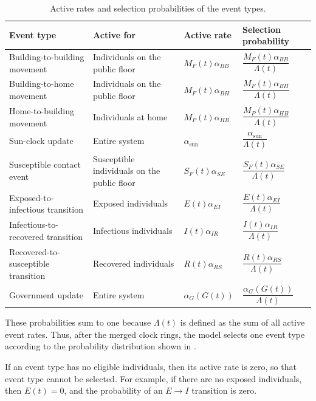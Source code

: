 \documentclass[11pt]{article}
\theoremstyle{definition}
\theoremstyle{plain}
\begin{document}
\begin{table}[H]
\centering
\caption{Active rates and selection probabilities of the event types.}
\label{tab:select}
\small
\renewcommand{\arraystretch}{1.8}
\begin{tabularx}{\textwidth}{@{}>{\raggedright\arraybackslash}X >{\raggedright\arraybackslash}X l l@{}}
\toprule
\textbf{Event type}
& \textbf{Active for}
& \textbf{Active rate}
& \textbf{Selection probability} \\
\midrule
Building-to-building movement
& Individuals on the public floor
& $M_F(t)\alpha_{BB}$
& $\dfrac{M_F(t)\alpha_{BB}}{\Lambda(t)}$ \\
Building-to-home movement
& Individuals on the public floor
& $M_F(t)\alpha_{BH}$
& $\dfrac{M_F(t)\alpha_{BH}}{\Lambda(t)}$ \\
Home-to-building movement
& Individuals at home
& $M_P(t)\alpha_{HB}$
& $\dfrac{M_P(t)\alpha_{HB}}{\Lambda(t)}$ \\
Sun-clock update
& Entire system
& $\alpha_{\mathrm{sun}}$
& $\dfrac{\alpha_{\mathrm{sun}}}{\Lambda(t)}$ \\
Susceptible contact event
& Susceptible individuals on the public floor
& $S_F(t)\alpha_{SE}$
& $\dfrac{S_F(t)\alpha_{SE}}{\Lambda(t)}$ \\
Exposed-to-infectious transition
& Exposed individuals
& $E(t)\alpha_{EI}$
& $\dfrac{E(t)\alpha_{EI}}{\Lambda(t)}$ \\
Infectious-to-recovered transition
& Infectious individuals
& $I(t)\alpha_{IR}$
& $\dfrac{I(t)\alpha_{IR}}{\Lambda(t)}$ \\
Recovered-to-susceptible transition
& Recovered individuals
& $R(t)\alpha_{RS}$
& $\dfrac{R(t)\alpha_{RS}}{\Lambda(t)}$ \\
Government update
& Entire system
& $\alpha_G(G(t))$
& $\dfrac{\alpha_G(G(t))}{\Lambda(t)}$ \\
\bottomrule
\end{tabularx}
\end{table}

These probabilities sum to one because $\Lambda(t)$ is defined as the sum of all active
event rates. Thus, after the merged clock rings, the model selects one event type according
to the probability distribution shown in .

If an event type has no eligible individuals, then its active rate is zero, so that event type
cannot be selected. For example, if there are no exposed individuals, then $E(t)=0$, and
the probability of an $E \rightarrow I$ transition is zero.
\end{document}
